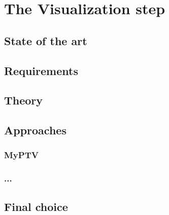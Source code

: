 \chapter{The Visualization step}
\label{chap:visual}

\section{State of the art}
\section{Requirements}
\section{Theory}
\section{Approaches}
\subsection{MyPTV}
\subsection{...}
\section{Final choice}
